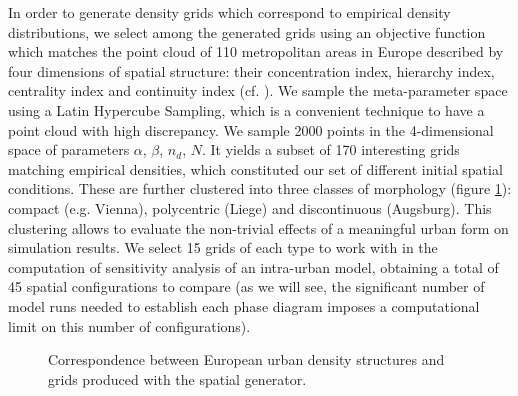 \documentclass[3p,times,procedia]{elsarticle}
\begin{document}

In order to generate density grids which correspond to empirical density distributions, we select among the generated grids using an objective function which matches the point cloud of 110 metropolitan areas in Europe described by four dimensions of spatial structure: their concentration index, hierarchy index, centrality index and continuity index (cf. \cite{LeNechet2015}). We sample the meta-parameter space using a Latin Hypercube Sampling, which is a convenient technique to have a point cloud with high discrepancy. We sample 2000 points in the 4-dimensional space of parameters {$\alpha$, $\beta$, $n_d$, $N$}. It yields a subset of 170 interesting grids matching empirical densities, which constituted our set of different initial spatial conditions. These are further clustered into three classes of morphology (figure \ref{fig:densityTypes}): compact (e.g. Vienna), polycentric (Liege) and discontinuous (Augsburg). This clustering allows to evaluate the non-trivial effects of a meaningful urban form on simulation results. We select 15 grids of each type to work with in the computation of sensitivity analysis of an intra-urban model, obtaining a total of 45 spatial configurations to compare (as we will see, the significant number of model runs needed to establish each phase diagram imposes a computational limit on this number of configurations).

\begin{figure}[htbp] \begin{center} 
 \caption{Correspondence between European urban density structures and grids produced with the spatial generator.} 
\label{fig:densityTypes} \end{center} \end{figure} %
\end{document}
